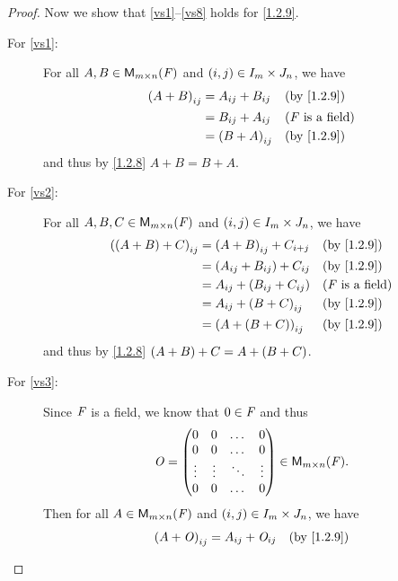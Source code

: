 \begin{proof}
  Now we show that \ref{vs1}--\ref{vs8} holds for \cref{1.2.9}.
  \begin{description}
    \item[For \ref{vs1}:]
      For all \(A, B \in {{\mathsf{M}_{{m} \times n}({\mathit{F}})}}\) and \(\left\lparen i, j\right\rparen \in I_{m} \times J_{n}\), we have
      \begin{align*}
        \p{A + B}_{i j} & = A_{i j} + B_{i j} &  & \text{(by \cref{1.2.9})}   \\
                        & = B_{i j} + A_{i j} &  & \text{(\(\F\) is a field)} \\
                        & = \p{B + A}_{i j}   &  & \text{(by \cref{1.2.9})}
      \end{align*}
      and thus by \cref{1.2.8} \(A + B = B + A\).
    \item[For \ref{vs2}:]
      For all \(A, B, C \in {{\mathsf{M}_{{m} \times n}({\mathit{F}})}}\) and \(\left\lparen i, j\right\rparen \in I_{m} \times J_{n}\), we have
      \begin{align*}
        \p{\p{A + B} + C}_{i j} & = \p{A + B}_{i j} + C_{i + j}     &  & \text{(by \cref{1.2.9})}   \\
                                & = \p{A_{i j} + B_{i j}} + C_{i j} &  & \text{(by \cref{1.2.9})}   \\
                                & = A_{i j} + \p{B_{i j} + C_{i j}} &  & \text{(\(\F\) is a field)} \\
                                & = A_{i j} + \p{B + C}_{i j}       &  & \text{(by \cref{1.2.9})}   \\
                                & = \p{A + \p{B + C}}_{i j}         &  & \text{(by \cref{1.2.9})}
      \end{align*}
      and thus by \cref{1.2.8} \(\left\lparen A + B\right\rparen + C = A + \left\lparen B + C\right\rparen\).
    \item[For \ref{vs3}:]
      Since \(\mathit{F}\) is a field, we know that \(0 \in \mathit{F}\) and thus
      \[
        \mathit{O} = \begin{pmatrix}
          0      & 0      & \dots  & 0      \\
          0      & 0      & \dots  & 0      \\
          \vdots & \vdots & \ddots & \vdots \\
          0      & 0      & \dots  & 0
        \end{pmatrix} \in {{\mathsf{M}_{{m} \times n}({\mathit{F}})}}.
      \]
      Then for all \(A \in {{\mathsf{M}_{{m} \times n}({\mathit{F}})}}\) and \(\left\lparen i, j\right\rparen \in I_{m} \times J_{n}\), we have
      \begin{align*}
        \p{A + \zm}_{i j} & = A_{i j} + \zm_{i j} &  & \text{(by \cref{1.2.9})}   \\

\end{align*}
\end{description}
\end{proof}
